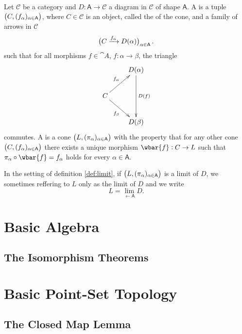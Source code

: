 \begin{definition}
	Let $\mathcal{C}$ be a category and $D : \mathsf{A} \to \mathcal{C}$ a diagram in $\mathcal{C}$ of shape $\mathsf{A}$. A  is a tuple $\del[1]{C,(f_\alpha)_{\alpha \in \mathsf{A}}}$, where $C \in \mathcal{C}$ is an object, called the  of the cone, and a family of arrows in $\mathcal{C}$
	\begin{equation}
		\del[1]{C \xrightarrow{f_\alpha} D(\alpha)}_{\alpha \in \mathsf{A}}.
	\end{equation}
	\noindent such that for all morphisms $f \in \cat{A}$, $f : \alpha \to \beta$, the triangle
	\begin{equation*}
		\xymatrix{
			& D(\alpha) \ar[dd]^{D(f)}\\
			C \ar[ur]^{f_\alpha}\ar[dr]_{f_\beta}\\
			& D(\beta)}
	\end{equation*}
	\noindent commutes. A  is a cone $\del[1]{L, (\pi_\alpha)_{\alpha \in \mathsf{A}}}$ with the property that for any other cone $\del[1]{C,(f_\alpha)_{\alpha \in \mathsf{A}}}$ there exists a unique morphism $\wbar{f} : C \to L$ such that $\pi_\alpha \circ \wbar{f} = f_\alpha$ holds for every $\alpha \in \mathsf{A}$.
	\label{def:limit}
\end{definition}

\begin{remark}
	In the setting of definition \ref{def:limit}, if $\del[1]{L, (\pi_\alpha)_{\alpha \in \cat{A}}}$ is a limit of $D$, we sometimes reffering to $L$ only as the limit of $D$ and we write
	\begin{equation}
		L = \lim_{\leftarrow \mathsf{A}} D.
	\end{equation}
\end{remark}

\section*{Basic Algebra}
\subsection*{The Isomorphism Theorems}

\section*{Basic Point-Set Topology}
\subsection*{The Closed Map Lemma}

